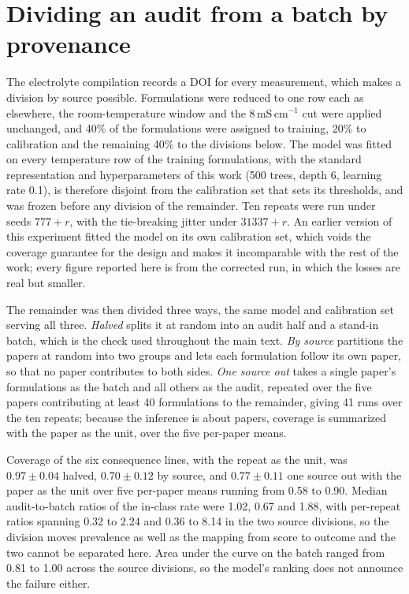 \documentclass[10pt]{article}
\begin{document}


\section{Dividing an audit from a batch by provenance}
\label{sec:source}

The electrolyte compilation records a DOI for every measurement, which makes a division by
source possible. Formulations were reduced to one row each as elsewhere, the room-temperature
window and the $8\,\mathrm{mS\,cm^{-1}}$ cut were applied unchanged, and 40\% of the
formulations were assigned to training, 20\% to calibration and the remaining 40\% to the
divisions below. The model was fitted on every temperature row of the training formulations,
with the standard representation and hyperparameters of this work (500 trees, depth 6,
learning rate 0.1), is therefore disjoint from the calibration set that sets its thresholds,
and was frozen before any division of the remainder. Ten repeats were run under seeds
$777+r$, with the tie-breaking jitter under $31337+r$. An earlier version of this experiment
fitted the model on its own calibration set, which voids the coverage guarantee for the
design and makes it incomparable with the rest of the work; every figure reported here is
from the corrected run, in which the losses are real but smaller.

The remainder was then divided three ways, the same model and calibration set serving all
three. \emph{Halved} splits it at random into an audit half and a stand-in batch, which is
the check used throughout the main text. \emph{By source} partitions the papers at random
into two groups and lets each formulation follow its own paper, so that no paper contributes
to both sides. \emph{One source out} takes a single paper's formulations as the batch and all
others as the audit, repeated over the five papers contributing at least 40 formulations to
the remainder, giving 41 runs over the ten repeats; because the inference is about papers, coverage is summarized with the paper as the unit, over the five per-paper means.

Coverage of the six consequence lines, with the repeat as the unit, was $0.97\pm0.04$ halved,
$0.70\pm0.12$ by source, and $0.77\pm0.11$ one source out with the paper as the unit over five per-paper means running from 0.58 to 0.90. Median audit-to-batch ratios of the
in-class rate were 1.02, 0.67 and 1.88, with per-repeat ratios spanning 0.32 to 2.24 and 0.36
to 8.14 in the two source divisions, so the division moves prevalence as well as the mapping
from score to outcome and the two cannot be separated here. Area under the curve on the batch
ranged from 0.81 to 1.00 across the source divisions, so the model's ranking does not
announce the failure either.
\end{document}
